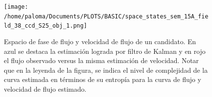\begin{figure}[h!]
\centering

\texttt{[image: /home/paloma/Documents/PLOTS/BASIC/space\_states\_sem\_15A\_field\_38\_ccd\_S25\_obj\_1.png]}
\caption{Espacio de fase de flujo y velocidad de flujo de un candidato. En azul se destaca la estimaci\'on lograda por filtro de Kalman y en rojo el flujo observado versus la misma estimaci\'on de velocidad. Notar que en la leyenda de la figura, se indica el nivel de complejidad de la curva estimada en t\'erminos de su entrop\'ia \cite{balestrino} para la curva de flujo y velocidad de flujo estimado.}
\label{fig:sp_st}
\end{figure}
